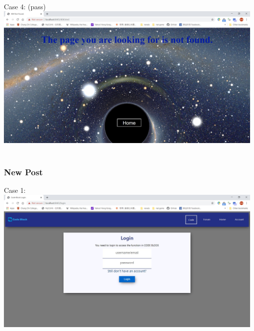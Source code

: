 ~

Case 4: (pass)\\
\includegraphics[scale=0.45]{Doc/Pics/404}\\

~

\subsubsection{New Post}
Case 1:\\
\includegraphics[scale=0.45]{Doc/Pics/login}\\

~

